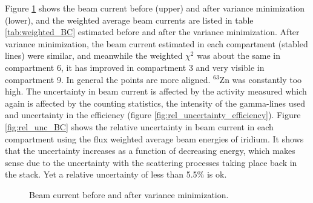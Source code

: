 \noindent
Figure \ref{fig:varmin_beamcurrent} shows the beam current before (upper) and after variance minimization (lower), and the weighted average beam currents are listed in table \ref{tab:weighted_BC} estimated before and after the variance minimization. After variance minimization, the beam current estimated in each compartment (stabled lines) were similar, and meanwhile the weighted $\chi^2$ was about the same in compartment 6, it has improved in compartment 3 and very visible in compartment 9. In general the points are more aligned. $^{63}$Zn was constantly too high. The uncertainty in beam current is affected by the activity measured which again is affected by the counting statistics, the intensity of the gamma-lines used and uncertainty in the efficiency (figure \ref{fig:rel_uncertainty_efficiency}). Figure \ref{fig:rel_unc_BC} shows the relative uncertainty in beam current in each compartment using the flux weighted average beam energies of iridium. It shows that the uncertainty increases as a function of decreasing energy, which makes sense due to the uncertainty with the scattering processes taking place back in the stack. Yet a relative uncertainty of less than 5.5\% is ok. 
\begin{figure}%
    \centering
    \hfill
    \caption{Beam current before and after variance minimization.  }%
    \label{fig:varmin_beamcurrent}%
\end{figure}

